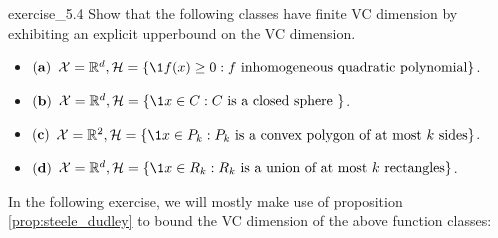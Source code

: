 \begin{exercise}{}{exercise_5.4}
    Show that the following classes have finite VC dimension by exhibiting an explicit upperbound on the VC dimension.
    \begin{itemize}
        \item ${\bf (a)}$ $\X=\R^d, \Hf=\{ \1{f(x)\ge0} : f \text{ inhomogeneous quadratic polynomial} \}$.
        \item ${\bf (b)}$ $\X=\R^d, \Hf=\{ \1{x \in C} : C \text{ is a closed sphere }\}$.
        \item ${\bf (c)}$ $\X=\R^2, \Hf=\{ \1{x \in P_k} : P_k \text{ is a convex polygon of at most $k$ sides} \}$.
        \item ${\bf (d)}$ $\X=\R^d, \Hf=\{ \1{x \in R_k} : R_k \text{ is a union of at most $k$ rectangles} \}$.
    \end{itemize}
\end{exercise}

\begin{solution*}
    In the following exercise, we will mostly make use of proposition \ref{prop:steele_dudley} to bound the VC dimension of the above function classes:
    
\end{solution*}


